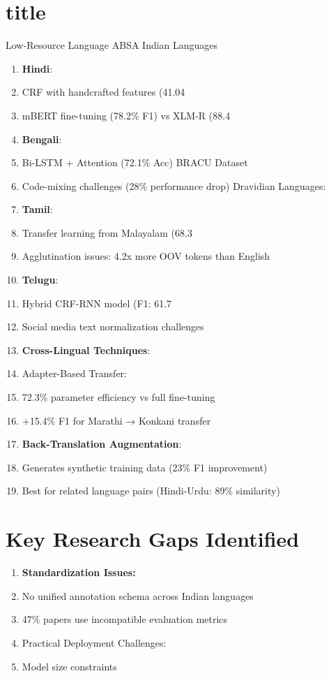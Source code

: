 \documentclass[]{article}
\begin{document}
\section{title}
Low-Resource Language ABSA
Indian Languages
\begin{enumerate}
\item [] \textbf{Hindi}:
\item CRF with handcrafted features (41.04%
\item mBERT fine-tuning (78.2\% F1) vs XLM-R (88.4%
\item [] \textbf{Bengali}:
\item Bi-LSTM + Attention (72.1\% Acc) BRACU Dataset
\item Code-mixing challenges (28\% performance drop)
Dravidian Languages:
\item[] \textbf{Tamil}:
\item Transfer learning from Malayalam (68.3%
\item Agglutination issues: 4.2x more OOV tokens than English
\item [] \textbf{Telugu}:
\item Hybrid CRF-RNN model (F1: 61.7%
\item Social media text normalization challenges
\item \textbf{Cross-Lingual Techniques}:
\item Adapter-Based Transfer:
\item 72.3\% parameter efficiency vs full fine-tuning
\item +15.4\% F1 for Marathi → Konkani transfer
\item \textbf{Back-Translation Augmentation}:
\item Generates synthetic training data (23\% F1 improvement)
\item Best for related language pairs (Hindi-Urdu: 89\% similarity)
\end{enumerate}
\section{Key Research Gaps Identified}
\begin{enumerate}
\item []
\textbf{Standardization Issues:}
\item No unified annotation schema across Indian languages
\item 47\% papers use incompatible evaluation metrics
\item Practical Deployment Challenges:
\item Model size constraints
\end{enumerate}
\end{document}
